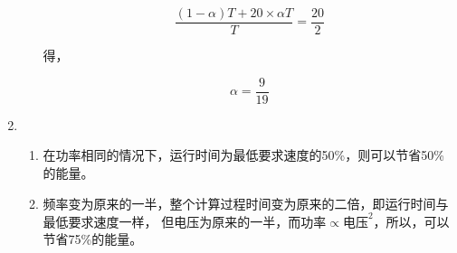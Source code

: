 \documentclass{article}
\begin{document}
\begin{enumerate}[label=\textbf{EX\arabic*}]
\begin{enumerate}[label=2.\arabic*]
            $$\frac{(1-\alpha)T + 20 \times \alpha T}{T} = \frac{20}{2}$$

            得，

            $$\alpha = \frac{9}{19}$$
        \end{enumerate}
        \item \begin{enumerate}[label=3.\arabic*]
            \item 在功率相同的情况下，运行时间为最低要求速度的50\%，则可以节省50\%的能量。
            \item 频率变为原来的一半，整个计算过程时间变为原来的二倍，即运行时间与最低要求速度一样，
            但电压为原来的一半，而$\text{功率}\propto\text{电压}^2$，所以，可以节省75\%的能量。
        \end{enumerate}
    \end{enumerate}
\end{document}
